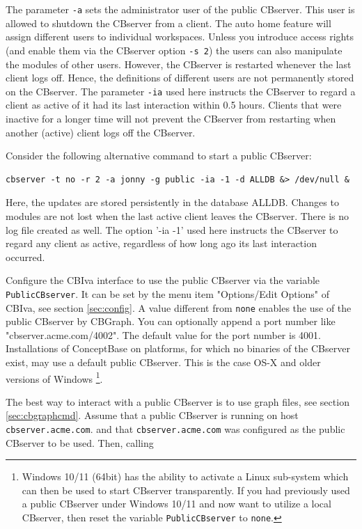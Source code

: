The parameter {\tt -a} sets the administrator user of the public CBserver. This user
is allowed to shutdown the CBserver from a client.
The auto home feature will assign different users to individual workspaces.
Unless you introduce access rights (and enable them via the CBserver option {\tt -s 2})
the users can also manipulate the modules of other users. However, the CBserver is
restarted whenever the last client logs off. Hence, the definitions of different users
are not permanently stored on the CBserver.
The parameter {\tt -ia} used here instructs the CBserver to regard a client as active of it
had its last interaction within 0.5 hours. Clients that were inactive for a longer
time will not prevent the CBserver from restarting when another (active) client 
logs off the CBserver.

Consider the following alternative command to start a public CBserver:

{\small
\begin{verbatim}
cbserver -t no -r 2 -a jonny -g public -ia -1 -d ALLDB &> /dev/null &
\end{verbatim}
}

Here, the updates are stored persistently in the database ALLDB. Changes to modules are not lost
when the last active client leaves the CBserver. There is no log file created as well.
The option '-ia -1' used here instructs the CBserver to regard any client as active,
regardless of how long ago its last interaction occurred.


Configure the CBIva interface to use the public CBserver via the variable {\tt PublicCBserver}.
It can be set by the menu item "Options/Edit Options" of CBIva, see section \ref{sec:config}.
A value different from {\tt none} enables the use of the public CBserver by CBGraph.
You can optionally append a port number like "cbserver.acme.com/4002". The default value
for the port number is 4001. Installations of ConceptBase on platforms, for which no binaries of the CBserver
exist, may use a default public CBserver. This is the case OS-X and older versions of Windows%
\footnote{Windows 10/11 (64bit) has the ability to activate a Linux sub-system
which can then be used to start CBserver transparently.
If you had previously used a public CBserver under Windows 10/11 and now want to utilize a local CBserver,
then reset the variable {\tt PublicCBserver} to {\tt none}.}.


The best way to interact with a public CBserver is to use graph files, see section
\ref{sec:cbgraphcmd}. Assume that a public CBserver is running on host {\tt cbserver.acme.com}.
and that {\tt cbserver.acme.com} was configured as the public CBserver to be used.
Then, calling

